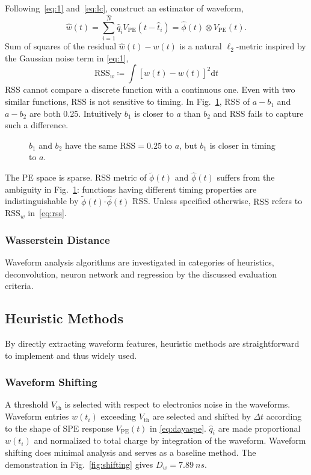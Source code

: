 Following~\eqref{eq:1} and~\eqref{eq:lc}, construct an estimator of waveform,
\begin{equation}
  \label{eq:w-hat}
  \hat{w}(t) = \sum_{i=1}^{\hat{N}}\hat{q}_iV_\mathrm{PE}(t-\hat{t}_i) = \hat{\phi}(t) \otimes V_\mathrm{PE}(t).
\end{equation}
Sum of squares of the residual $\hat{w}(t) - w(t)$ is a natural $\ell_2$-metric inspired by the Gaussian noise term in \eqref{eq:1},
\begin{equation}
  \label{eq:rss}
  \mathrm{RSS}_w\coloneqq\int\left[\hat{w}(t) - w(t)\right]^2\mathrm{d}t
\end{equation}
RSS cannot compare a discrete function with a continuous one.  Even with two similar functions, RSS is not sensitive to timing.  In Fig.~\ref{fig:l2}, RSS of  $a-b_{1}$ and $a-b_{2}$ are both 0.25.  Intuitively $b_1$ is closer to $a$ than $b_2$ and RSS fails to capture such a difference.
\begin{figure}[H]
  \centering
  \scalebox{0.4}{}
  \caption{\label{fig:l2} $b_1$ and $b_2$ have the same $\mathrm{RSS}=0.25$ to $a$, but $b_1$ is closer in timing to $a$.}
\end{figure}

The PE space is sparse. RSS metric of $\tilde{\phi}(t)$ and $\hat{\phi}(t)$ suffers from the ambiguity in Fig.~\ref{fig:l2}: functions having different timing properties are indistinguishable by $\tilde{\phi}(t)$-$\hat{\phi}(t)$ RSS.  Unless specified otherwise, $\mathrm{RSS}$ refers to $\mathrm{RSS}_w$ in~\eqref{eq:rss}.

\subsubsection{Wasserstein Distance}
\label{sec:W-dist}



Waveform analysis algorithms are investigated in categories of heuristics, deconvolution, neuron network and regression by the discussed evaluation criteria.

\subsection{Heuristic Methods}
By directly extracting waveform features, heuristic methods are straightforward to implement and thus widely used. 

\subsubsection{Waveform Shifting}
\label{sec:shifting}
A threshold $V_\mathrm{th}$ is selected with respect to electronics noise in the waveforms. Waveform entries $w(t_i)$ exceeding $V_\mathrm{th}$ are selected and shifted by $\Delta t$ according to the shape of SPE response $V_\mathrm{PE}(t)$ in \eqref{eq:dayaspe}. $\hat{q}_i$ are made proportional $w(t_i)$ and normalized to total charge by integration of the waveform.  Waveform shifting does minimal analysis and serves as a baseline method.  The demonstration in Fig.~\ref{fig:shifting} gives $D_w = \SI{7.89}{ns}$.

